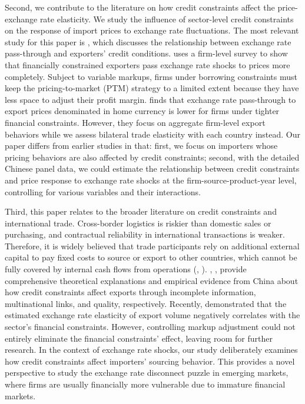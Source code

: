 \documentclass[12pt]{article}
\begin{document}
Second, we contribute to the literature on how credit constraints affect the price-exchange rate elasticity. We study the influence of sector-level credit constraints on the response of import prices to exchange rate fluctuations. The most relevant study for this paper is \cite{strasser2013}, which discusses the relationship between exchange rate pass-through and exporters' credit conditions. \cite{strasser2013} uses a firm-level survey to show that financially constrained exporters pass exchange rate shocks to prices more completely. Subject to variable markups, firms under borrowing constraints must keep the pricing-to-market (PTM) strategy to a limited extent because they have less space to adjust their profit margin. \cite{dai2021} finds that exchange rate pass-through to export prices denominated in home currency is lower for firms under tighter financial constraints. However, they focus on aggregate firm-level export behaviors while we assess bilateral trade elasticity with each country instead. Our paper differs from earlier studies in that: first, we focus on importers whose pricing behaviors are also affected by credit constraints; second, with the detailed Chinese panel data, we could estimate the relationship between credit constraints and price response to exchange rate shocks at the firm-source-product-year level, controlling for various variables and their interactions.

Third, this paper relates to the broader literature on credit constraints and international trade. Cross-border logistics is riskier than domestic sales or purchasing, and contractual reliability in international transactions is weaker. Therefore, it is widely believed that trade participants rely on additional external capital to pay fixed costs to source or export to other countries, which cannot be fully covered by internal cash flows from operations (\cite{manova2013}, \cite{chaney2016}). \cite{feenstra-li-yu2014}, \cite{manova-wei-zhang2015}, \cite{fan-lai-li2015} provide comprehensive theoretical explanations and empirical evidence from China about how credit constraints affect exports through incomplete information, multinational links, and quality, respectively. Recently, \cite{xu-guo2021} demonstrated that the estimated exchange rate elasticity of export volume negatively correlates with the sector’s financial constraints. However, controlling markup adjustment could not entirely eliminate the financial constraints' effect, leaving room for further research. In the context of exchange rate shocks, our study deliberately examines how credit constraints affect importers' sourcing behavior. This provides a novel perspective to study the exchange rate disconnect puzzle in emerging markets, where firms are usually financially more vulnerable due to immature financial markets.
\end{document}
